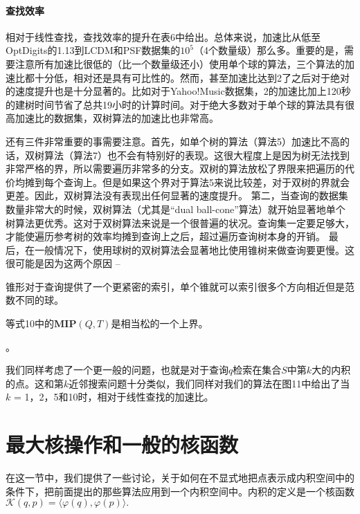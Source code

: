 \documentclass[twocolumn]{article}
\begin{document}
\paragraph{查找效率}
相对于线性查找，查找效率的提升在表6中给出。总体来说，加速比从低至OptDigits的1.13到LCDM和PSF数据集的$10^5$（4个数量级）那么多。重要的是，需要注意所有加速比很低的（比一个数量级还小）使用单个球的算法，三个算法的加速比都十分低，相对还是具有可比性的。然而，甚至加速比达到2了之后对于绝对的速度提升也是十分显著的。比如对于Yahoo!Music数据集，2的加速比加上120秒的建树时间节省了总共19小时的计算时间。对于绝大多数对于单个球的算法具有很高加速比的数据集，双树算法的加速比也非常高。

还有三件非常重要的事需要注意。首先，如单个树的算法（算法5）加速比不高的话，双树算法（算法7）也不会有特别好的表现。这很大程度上是因为树无法找到非常严格的界，所以需要遍历非常多的分支。双树的算法放松了界限来把遍历的代价均摊到每个查询上。但是如果这个界对于算法5来说比较差，对于双树的界就会更差。因此，双树算法没有表现出任何显著的速度提升。
第二，当查询的数据集数量非常大的时候，双树算法（尤其是“dual ball-cone”算法）就开始显著地单个树算法更优秀。这对于双树算法来说是一个很普遍的状况。查询集一定要足够大，才能使遍历参考树的效率均摊到查询上之后，超过遍历查询树本身的开销。
最后，在一般情况下，使用球树的双树算法会显著地比使用锥树来做查询要更慢。这很可能是因为这两个原因 --
\begin{enumerate*}[label={\roman*}]
\item 锥形对于查询提供了一个更紧密的索引，单个锥就可以索引很多个方向相近但是范数不同的球。
\item 等式10中的$\mathbf{MIP}(Q,T)$是相当松的一个上界。
\end{enumerate*}。

我们同样考虑了一个更一般的问题，也就是对于查询$q$检索在集合$S$中第$k$大的内积的点。这和第$k$近邻搜索问题十分类似，我们同样对我们的算法在图11中给出了当$k$ = 1，2，5和10时，相对于线性查找的加速比。

\section{最大核操作和一般的核函数}
在这一节中，我们提供了一些讨论，关于如何在不显式地把点表示成内积空间中的条件下，把前面提出的那些算法应用到一个内积空间中。内积的定义是一个核函数$\mathcal{K}(q,p)=\langle \varphi(q),\varphi(p) \rangle.$
\end{document}
